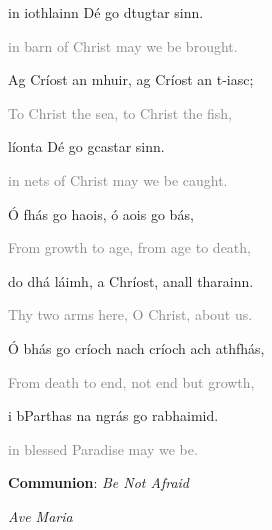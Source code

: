 \documentclass[14pt,landscape]{extarticle}
\begin{document}
\begin{multicols}{2}
\hspace{1em} in iothlainn D\'e go dtugtar sinn.

\hspace{2em} \textcolor{gray}{\small in barn of Christ may we be brought.}

\columnbreak

\hspace{1em} Ag Cr\'iost an mhuir, ag Cr\'iost an t-iasc;

\hspace{2em} \textcolor{gray}{\small To Christ the sea, to Christ the fish,}

\hspace{1em} l\'ionta D\'e go gcastar sinn.

\hspace{2em} \textcolor{gray}{\small in nets of Christ may we be caught.}


\vspace{1em}

\hspace{1em} \'O fh\'as go haois, \'o aois go b\'as,

\hspace{2em} \textcolor{gray}{\small From growth to age, from age to death,}

\hspace{1em} do dh\'a l\'aimh, a Chr\'iost, anall tharainn.

\hspace{2em} \textcolor{gray}{\small Thy two arms here, O Christ, about us.}


\vspace{1em}


\hspace{1em} \'O bh\'as go cr\'ioch nach cr\'ioch ach athfh\'as,

\hspace{2em} \textcolor{gray}{\small From death to end, not end but growth,}

\hspace{1em} i bParthas na ngr\'as go rabhaimid.

\hspace{2em} \textcolor{gray}{\small in blessed Paradise may we be.}

\vspace{1em}

{\bf Communion}: {\em Be Not Afraid}  

\hspace{6.5em} {\em Ave Maria}

\vspace{1em}


\end{multicols}
\end{document}
